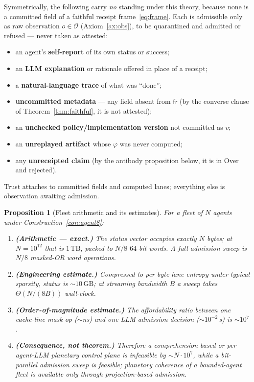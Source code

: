 \documentclass[11pt,oneside]{book}
\theoremstyle{definition}
\theoremstyle{plain}
\newtheorem{proposition}[theorem]{Proposition}
\theoremstyle{remark}
\newcommand{\Obs}{\mathcal{O}}                 %
\newcommand{\Fitness}{\varphi}
\begin{document}
Symmetrically, the following carry \emph{no} standing under this theory, because none is a
committed field of a faithful receipt frame~\eqref{eq:frame}. Each is admissible only as raw
observation $o\in\Obs$ (Axiom~\ref{ax:obs}), to be quarantined and admitted or refused ---
never taken as attested:
\begin{itemize}[leftmargin=1.4em,itemsep=1pt]
\item an agent's \textbf{self-report} of its own status or success;
\item an \textbf{LLM explanation} or rationale offered in place of a receipt;
\item a \textbf{natural-language trace} of what was ``done'';
\item \textbf{uncommitted metadata} --- any field absent from $\mathsf{fr}$ (by the converse
      clause of Theorem~\ref{thm:faithful}, it is not attested);
\item an \textbf{unchecked policy/implementation version} not committed as $v$;
\item an \textbf{unreplayed artifact} whose $\Fitness$ was never computed;
\item any \textbf{unreceipted claim} (by the antibody proposition below, it is in
      $\mathrm{Over}$ and rejected).
\end{itemize}
Trust attaches to committed fields and computed lanes; everything else is observation awaiting
admission.

\begin{proposition}[Fleet arithmetic and its estimates]\label{prop:planetary}
For a fleet of $N$ agents under Construction~\ref{con:agent8}:
\begin{enumerate}[label=(\alph*),leftmargin=1.6em,itemsep=1pt]
\item \textbf{(Arithmetic --- exact.)} The status vector occupies exactly $N$ bytes; at
      $N=10^{12}$ that is $1\,\mathrm{TB}$, packed to $N/8$ $64$-bit words. A full admission
      sweep is $N/8$ masked-OR word operations.
\item \textbf{(Engineering estimate.)} Compressed to per-byte lane entropy under typical
      sparsity, status is $\sim\!10\,\mathrm{GB}$; at streaming bandwidth $B$ a sweep takes
      $\Theta(N/(8B))$ wall-clock.
\item \textbf{(Order-of-magnitude estimate.)} The affordability ratio between one cache-line
      mask op ($\sim$ns) and one LLM admission decision ($\sim\!10^{-2}\,$s) is $\sim\!10^{7}$.
\item \textbf{(Consequence, not theorem.)} Therefore a comprehension-based or per-agent-LLM
      planetary control plane is infeasible by $\sim\!N\cdot 10^{7}$, while a bit-parallel
      admission sweep is feasible; planetary coherence of a bounded-agent fleet is available
      only through projection-based admission.
\end{enumerate}
\end{proposition}
\end{document}
